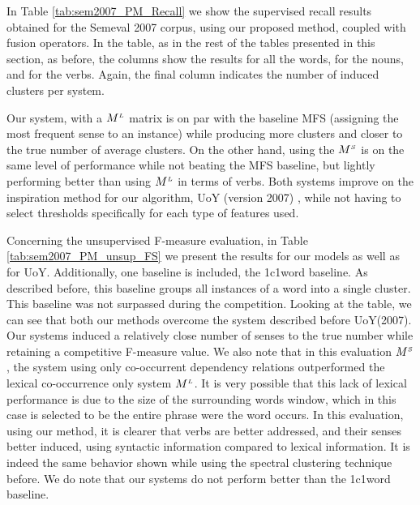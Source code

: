 In Table \ref{tab:sem2007_PM_Recall}  we show the supervised recall results obtained for the Semeval 2007 corpus, using our proposed method, coupled with fusion operators. In the table, as in the rest of the tables presented in this section, as before, the columns show the results for all the words, for the nouns, and for the verbs. Again, the final column indicates the number of induced clusters per system. 

Our system, with a  $M^{\scriptscriptstyle L}$ matrix is on par with the baseline MFS (assigning the most frequent sense to an instance) while producing more clusters and closer to the true number of average clusters. On the other hand, using the $M^{\scriptscriptstyle S}$ is on the same level of performance while not beating the MFS baseline, but lightly performing better than using $M^{\scriptscriptstyle L}$ in terms of verbs. Both systems improve on the inspiration method for our algorithm,  UoY (version 2007) \cite{2007.Klapaftis.UOY}, while not having to select thresholds specifically for each type of features used.


Concerning the unsupervised F-measure evaluation, in Table \ref{tab:sem2007_PM_unsup_FS} we present the results for our models as well as for UoY. Additionally, one baseline is included, the 1c1word baseline. As described before, this baseline  groups all instances of a word into a single cluster. This baseline was not surpassed during the competition. Looking at the table, we can see that both our methods overcome the system described before {UoY(2007)}. Our systems induced a relatively close number of senses to the true number while retaining a competitive F-measure value. We also note that in this evaluation $M^{\scriptscriptstyle S}$, the system using only co-occurrent dependency relations outperformed the lexical co-occurrence only system $M^{\scriptscriptstyle L}$. It is very possible that this lack of lexical performance is due to the size of the surrounding words window, which in this case is selected to be the entire phrase were the word occurs. In this evaluation, using our method,  it is clearer that  verbs are  better addressed, and their senses better induced, using syntactic information compared to lexical information. It is indeed the same behavior shown while using the spectral clustering technique before.  We do note that our systems do not perform better than the 1c1word baseline. 



